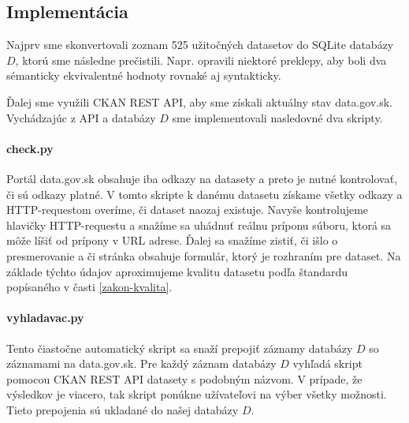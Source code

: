 \documentclass[12pt,a4paper]{article}
\begin{document}
\subsection{Implementácia}

Najprv sme skonvertovali zoznam 525 užitočných datasetov do SQLite databázy $D$, ktorú sme následne prečistili. Napr. opravili niektoré preklepy, aby boli dva sémanticky ekvivalentné hodnoty rovnaké aj syntakticky. 

Ďalej sme využili CKAN REST API, aby sme získali aktuálny stav data.gov.sk. Vychádzajúc z API a databázy $D$ sme implementovali nasledovné dva skripty. 

\paragraph{check.py}
Portál data.gov.sk obsahuje iba odkazy na datasety a preto je nutné kontrolovať, či sú odkazy platné. V tomto skripte k danému datasetu získame všetky odkazy a HTTP-requestom overíme, či dataset naozaj existuje. Navyše kontrolujeme hlavičky HTTP-requestu a snažíme sa uhádnuť reálnu príponu súboru, ktorá sa môže líšiť od prípony v URL adrese. Ďalej sa snažíme zistiť, či išlo o presmerovanie a či stránka obsahuje formulár, ktorý je rozhraním pre dataset. Na základe týchto údajov aproximujeme kvalitu datasetu podľa štandardu popísaného v časti \ref{zakon-kvalita}. 

\paragraph{vyhladavac.py} 
Tento čiastočne automatický skript sa snaží prepojiť záznamy databázy $D$ so záznamami na data.gov.sk. Pre každý záznam databázy $D$ vyhľadá skript pomocou CKAN REST API datasety s podobným názvom. V prípade, že výsledkov je viacero, tak skript ponúkne užívateľovi na výber všetky možnosti. Tieto prepojenia sú ukladané do našej databázy $D$. 

\end{document}

